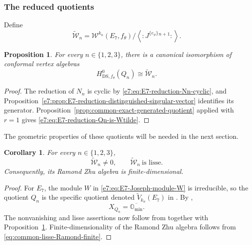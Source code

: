 \documentclass[11pt,reqno]{amsart}
\newtheorem{proposition}[theorem]{Proposition}
\newtheorem{corollary}[theorem]{Corollary}
\theoremstyle{definition}
\theoremstyle{remark}
\begin{document}
\subsubsection{The reduced quotients}


Define
\begin{equation}
  \widetilde{\mathcal W}_n
  =
  \mathcal W^{k_n}(E_7,f_\theta)
  \Big/
  \left\langle
    :J^{\{e_\vartheta\}}{}^{n+1}:
  \right\rangle.
  \label{e7:eq:E7-definition-Wtilde-n}
\end{equation}

\begin{proposition}
\label{e7:prop:E7-reduction-of-Qn}
For every \(n\in\{1,2,3\}\), there is a canonical isomorphism of conformal
vertex algebras
\begin{equation}
  H^0_{\mathrm{DS},f_\theta}(Q_n)
  \cong
  \widetilde{\mathcal W}_n.
  \label{e7:eq:E7-reduction-Qn-is-Wtilde}
\end{equation}
\end{proposition}

\begin{proof}
The reduction of $N_n$ is cyclic by
\eqref{e7:eq:E7-reduction-Nn-cyclic}, and
Proposition~\ref{e7:prop:E7-reduction-distinguished-singular-vector}
identifies its generator.  Proposition~\ref{prop:common-exact-generated-quotient}
applied with $r=1$ gives \eqref{e7:eq:E7-reduction-Qn-is-Wtilde}.
\end{proof}

The geometric properties of these quotients will be needed in the next
section.

\begin{corollary}

For every \(n\in\{1,2,3\}\),
\begin{equation}
  \widetilde{\mathcal W}_n\ne0,
  \qquad
  \widetilde{\mathcal W}_n\ \text{is lisse}.
  \label{e7:eq:E7-Wtilde-nonzero-lisse}
\end{equation}
Consequently, its Ramond Zhu algebra is finite-dimensional.
\end{corollary}

\begin{proof}
For \(E_7\), the module \(W\) in
\eqref{e7:eq:E7-Joseph-module-W} is irreducible, so the quotient \(Q_n\) is the
specific quotient denoted \(\widetilde V_{k_n}(E_7)\) in
\cite{ArakawaMoreau2018}.  By
\cite[Proposition~5.2]{ArakawaMoreau2018},
\begin{equation*}
  X_{Q_n}=\overline{\mathbb O_{\min}}.
\end{equation*}
The nonvanishing and lisse assertions now follow from
\cite[Theorem~6.1(3)]{ArakawaMoreau2018} together with
Proposition~\ref{e7:prop:E7-reduction-of-Qn}.  Finite-dimensionality of the
Ramond Zhu algebra follows from
\eqref{eq:common-lisse-Ramond-finite}.
\end{proof}
\end{document}
